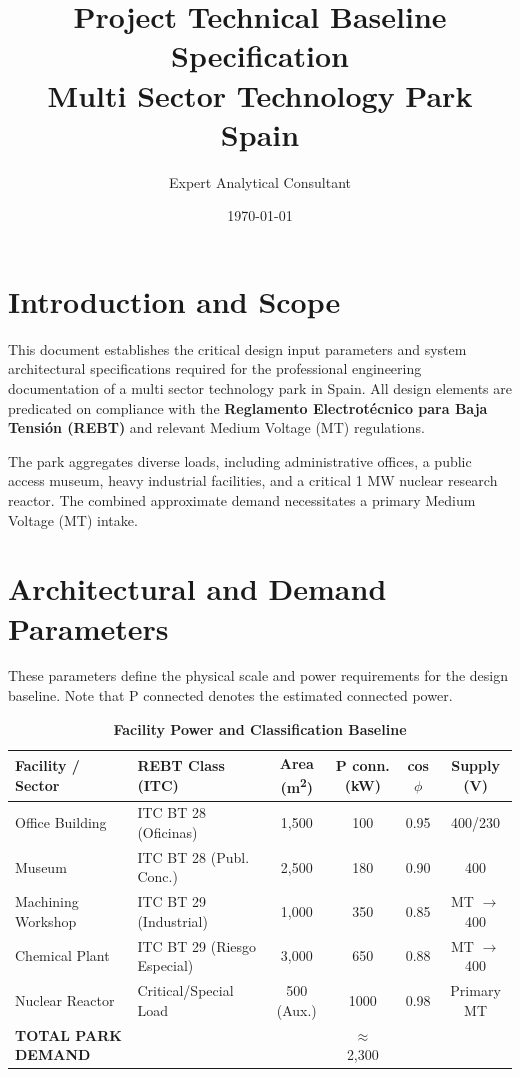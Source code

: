 \documentclass[10pt, a4paper]{article}
\title{\textbf{Project Technical Baseline Specification} \\ \small Multi Sector Technology Park Spain}
\author{Expert Analytical Consultant}
\date{\today}
\begin{document}
\maketitle

\section{Introduction and Scope}
This document establishes the critical design input parameters and system architectural specifications required for the professional engineering documentation of a multi sector technology park in Spain. All design elements are predicated on compliance with the \textbf{Reglamento Electrotécnico para Baja Tensión (REBT)} and relevant Medium Voltage (MT) regulations.

The park aggregates diverse loads, including administrative offices, a public access museum, heavy industrial facilities, and a critical 1 MW nuclear research reactor. The combined approximate demand necessitates a primary Medium Voltage (MT) intake.

\section{Architectural and Demand Parameters}
These parameters define the physical scale and power requirements for the design baseline. Note that P connected denotes the estimated connected power.

\begin{table}[h!]
    \centering
    \caption{\textbf{Facility Power and Classification Baseline}}
    \label{tab:demand baseline}
    \begin{tabular}{|p{2.5cm}|p{2.8cm}|c|c|c|c|}
        \hline
        \textbf{Facility / Sector} & \textbf{REBT Class (ITC)} & \textbf{Area (m\textsuperscript{2})} & \textbf{P conn. (kW)} & \textbf{cos $\phi$} & \textbf{Supply (V)} \\
        \hline
        Office Building & ITC BT 28 (Oficinas) & 1,500 & 100 & 0.95 & 400/230 \\
        \hline
        Museum & ITC BT 28 (Publ. Conc.) & 2,500 & 180 & 0.90 & 400 \\
        \hline
        Machining Workshop & ITC BT 29 (Industrial) & 1,000 & 350 & 0.85 & MT $\rightarrow$ 400 \\
        \hline
        Chemical Plant & ITC BT 29 (Riesgo Especial) & 3,000 & 650 & 0.88 & MT $\rightarrow$ 400 \\
        \hline
        Nuclear Reactor & Critical/Special Load & 500 (Aux.) & 1000 & 0.98 & Primary MT \\
        \hline
        \textbf{TOTAL PARK DEMAND} & & & $\approx$ 2,300 & & \\
        \hline
    \end{tabular}
\end{table}
\end{document}
